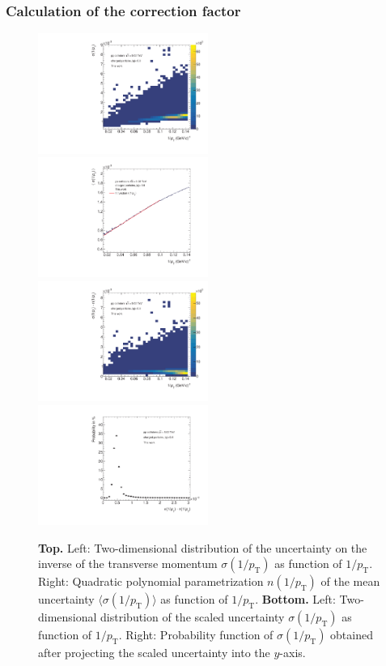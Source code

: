\documentclass[12pt,a4paper]{report}
\begin{document}
\subsubsection{Calculation of the correction factor}
\begin{figure}[tb!]
\centering
\includegraphics[width=0.495\textwidth]{Plots/reso2dim.pdf}  
\includegraphics[width=0.495\textwidth]{Plots/fitfunc.pdf}  
\includegraphics[width=0.495\textwidth]{Plots/scaledcov.pdf}  
\includegraphics[width=0.495\textwidth]{Plots/probabilitydist.pdf}  
\caption{\textbf{Top.} Left: Two-dimensional distribution of the uncertainty on the inverse of the transverse momentum $\sigma(1/p_{\mathrm{T}})$ as function of $1/p_{\mathrm{T}}$. Right: Quadratic polynomial parametrization $n(1/p_{\mathrm{T}})$ of the mean uncertainty $\langle\sigma(1/p_\text{T})\rangle$ as function of $1/p_{\mathrm{T}}$. \textbf{Bottom.} Left: Two-dimensional distribution of the scaled uncertainty $\sigma(1/p_{\mathrm{T}})$ as function of $1/p_{\mathrm{T}}$. Right: Probability function of $\sigma(1/p_\text{T})$ obtained after projecting the scaled uncertainty into the $y$-axis.}
\label{4plots}
\end{figure}
\end{document}
